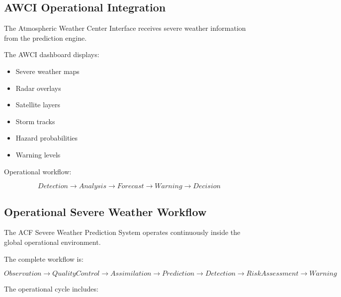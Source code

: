 
\subsection{AWCI Operational Integration}

The Atmospheric Weather Center Interface receives severe weather
information from the prediction engine.

The AWCI dashboard displays:

\begin{itemize}

\item Severe weather maps

\item Radar overlays

\item Satellite layers

\item Storm tracks

\item Hazard probabilities

\item Warning levels

\end{itemize}


Operational workflow:

\[
Detection
\rightarrow
Analysis
\rightarrow
Forecast
\rightarrow
Warning
\rightarrow
Decision
\]


\subsection{Operational Severe Weather Workflow}

The ACF Severe Weather Prediction System operates continuously inside
the global operational environment.

The complete workflow is:

\[
Observation
\rightarrow
Quality Control
\rightarrow
Assimilation
\rightarrow
Prediction
\rightarrow
Detection
\rightarrow
Risk Assessment
\rightarrow
Warning
\]

The operational cycle includes:

